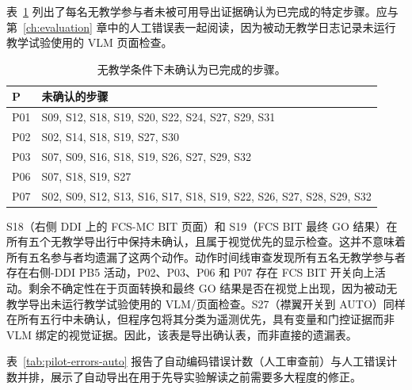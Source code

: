 表~\ref{tab:pilot-uncompleted} 列出了每名无教学参与者未被可用导出证据确认为已完成的特定步骤。应与第~\ref{ch:evaluation} 章中的人工错误表一起阅读，因为被动无教学日志记录未运行教学试验使用的 VLM 页面检查。

\begin{table}[htbp]
\centering
\caption{无教学条件下未确认为已完成的步骤。}\label{tab:pilot-uncompleted}
\small
\begin{tabularx}{\textwidth}{@{}l>{\raggedright\arraybackslash}X@{}}
\toprule
\textbf{P} & \textbf{未确认的步骤} \\
\midrule
P01 & S09, S12, S18, S19, S20, S22, S24, S27, S29, S31 \\
P02 & S02, S14, S18, S19, S27, S30 \\
P03 & S07, S09, S16, S18, S19, S26, S27, S29, S32 \\
P06 & S07, S18, S19, S27 \\
P07 & S02, S09, S12, S13, S16, S17, S18, S19, S22, S26, S27, S28, S29, S32 \\
\bottomrule
\end{tabularx}

S18（右侧 DDI 上的 FCS-MC BIT 页面）和 S19（FCS BIT 最终 GO 结果）在所有五个无教学导出行中保持未确认，且属于视觉优先的显示检查。这并不意味着所有五名参与者均遗漏了这两个动作。动作时间线审查发现所有五名无教学参与者存在右侧-DDI PB5 活动，P02、P03、P06 和 P07 存在 FCS BIT 开关向上活动。剩余不确定性在于页面转换和最终 GO 结果是否在视觉上出现，因为被动无教学导出未运行教学试验使用的 VLM/页面检查。S27（襟翼开关到 AUTO）同样在所有五行中未确认，但程序包将其分类为遥测优先，具有变量和门控证据而非 VLM 绑定的视觉证据。因此，该表是导出确认表，而非直接的遗漏表。
\end{table}

表~\ref{tab:pilot-errors-auto} 报告了自动编码错误计数（人工审查前）与人工错误计数并排，展示了自动导出在用于先导实验解读之前需要多大程度的修正。

